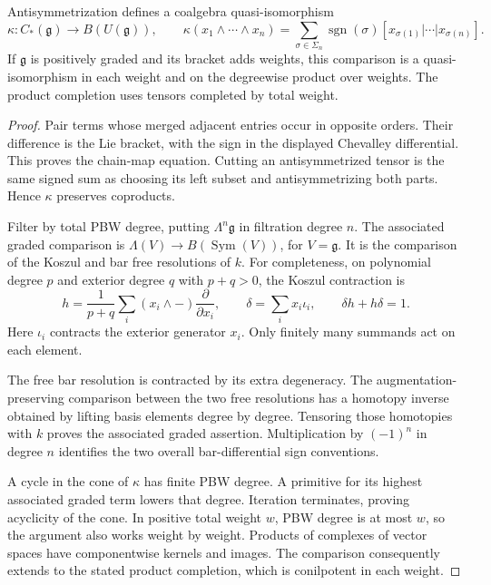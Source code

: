 \begin{theorem}
\label{thm:alg-bar-chevalley}
Antisymmetrization defines a coalgebra quasi-isomorphism
\[
 \kappa:C_*(\mathfrak g)\longrightarrow B(U(\mathfrak g)),\qquad
 \kappa(x_1\wedge\cdots\wedge x_n)
 =\sum_{\sigma\in\Sigma_n}\operatorname{sgn}(\sigma)
 [x_{\sigma(1)}|\cdots|x_{\sigma(n)}].
\]
If $\mathfrak g$ is positively graded and its bracket adds weights,
this comparison is a quasi-isomorphism in each weight and on the degreewise product over weights.
The product completion uses tensors completed by total weight.
\end{theorem}
\begin{proof}
Pair terms whose merged adjacent entries occur in opposite orders.
Their difference is the Lie bracket, with the sign in the displayed Chevalley differential.
This proves the chain-map equation.
Cutting an antisymmetrized tensor is the same signed sum as choosing its left subset and antisymmetrizing both parts.
Hence $\kappa$ preserves coproducts.

Filter by total PBW degree, putting $\Lambda^n\mathfrak g$ in filtration degree $n$.
The associated graded comparison is
$\Lambda(V)\to B(\operatorname{Sym}(V))$, for $V=\mathfrak g$.
It is the comparison of the Koszul and bar free resolutions of $k$.
For completeness, on polynomial degree $p$ and exterior degree $q$ with $p+q>0$, the Koszul contraction is
\[
 h=\frac1{p+q}\sum_i (x_i\wedge -)\frac{\partial}{\partial x_i},
 \qquad \delta=\sum_i x_i\iota_i,
 \qquad \delta h+h\delta=1.
\]
Here $\iota_i$ contracts the exterior generator $x_i$. Only finitely many summands act on each element.

The free bar resolution is contracted by its extra degeneracy.
The augmentation-preserving comparison between the two free resolutions has a homotopy inverse obtained by lifting basis elements degree by degree.
Tensoring those homotopies with $k$ proves the associated graded assertion.
Multiplication by $(-1)^n$ in degree $n$ identifies the two overall bar-differential sign conventions.

A cycle in the cone of $\kappa$ has finite PBW degree.
A primitive for its highest associated graded term lowers that degree.
Iteration terminates, proving acyclicity of the cone.
In positive total weight $w$, PBW degree is at most $w$, so the argument also works weight by weight.
Products of complexes of vector spaces have componentwise kernels and images.
The comparison consequently extends to the stated product completion, which is conilpotent in each weight.
\end{proof}

